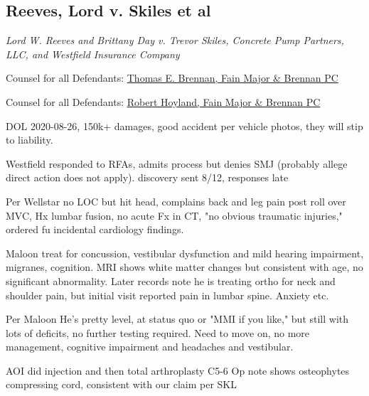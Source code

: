 \documentclass[11pt]{article}
\begin{document}
\subsection*{Reeves, Lord v. Skiles et al}
\label{sec:orged51e88}

\emph{Lord W. Reeves and Brittany Day v. Trevor Skiles, Concrete Pump Partners, LLC, and Westfield Insurance Company}

Counsel for all Defendants: \href{https://www.gabar.org/MemberSearchDetail.cfm?ID=MDc5NzU0}{Thomas E. Brennan, Fain Major \& Brennan PC}

Counsel for all Defendants: \href{https://www.gabar.org/MemberSearchDetail.cfm?ID=MTQxOTMx}{Robert Hoyland, Fain Major \& Brennan PC}

DOL 2020-08-26, 150k+ damages, good accident per vehicle photos, they will stip to liability.

Westfield responded to RFAs, admits process but denies SMJ (probably allege direct action does not apply). discovery sent 8/12, responses late

Per Wellstar no LOC but hit head, complains back and leg pain post roll over MVC, Hx lumbar fusion, no acute Fx in CT, "no obvious traumatic injuries," ordered fu incidental cardiology findings.

Maloon treat for concussion, vestibular dysfunction and mild hearing impairment, migranes, cognition. MRI shows white matter changes but consistent with age, no significant abnormality. Later records note he is treating ortho for neck and shoulder pain, but initial visit reported pain in lumbar spine. Anxiety etc.

Per Maloon He's pretty level, at status quo or "MMI if you like," but still with lots of deficits, no further testing required. Need to move on, no more management, cognitive impairment and headaches and vestibular.

AOI did injection and then total arthroplasty C5-6 Op note shows osteophytes compressing cord, consistent with our claim per SKL
\end{document}
